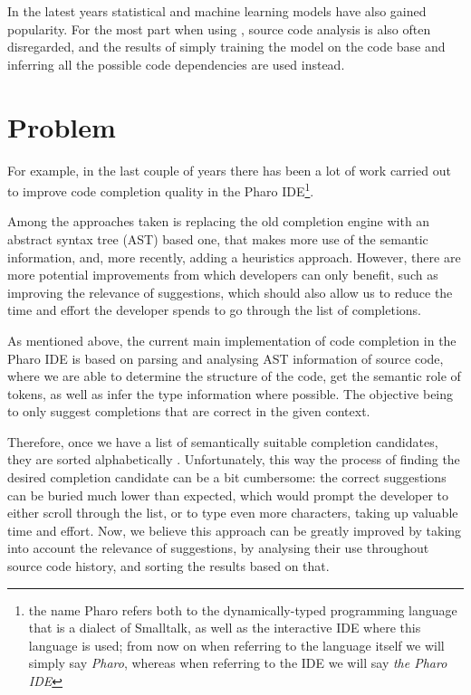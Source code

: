 In the latest years statistical and machine learning  models have also gained popularity.  For the most part when using  , source code analysis  is also often disregarded, and the results of simply training the model on the code base and inferring all the possible code dependencies are used instead. 

\section{Problem}
\label{sec:Introduction-Problem}
For example, in the last couple of years there has been a lot of work carried out to improve code completion quality in the Pharo IDE\footnote{the name Pharo refers both to the dynamically-typed programming language that is a dialect of Smalltalk, as well as the interactive IDE where this language is used; from now on when referring to the language itself we will simply say \textit{Pharo}, whereas when referring to the IDE we will say \textit{the Pharo IDE}}. 

Among the approaches taken is replacing the old completion engine with an abstract syntax tree (AST) based one, that makes more use of the semantic information, and, more recently, adding a heuristics approach.     However, there are more potential improvements from which developers can only benefit, such as improving the relevance of suggestions, which should also allow us to reduce the time and effort the developer spends to go through the list of completions. 

As mentioned above, the current main implementation of code completion in the Pharo IDE is based on parsing and analysing AST information of source code, where we are able to determine the structure of the code, get the semantic role of tokens, as well as infer the type information where possible. The objective being to only suggest completions that are correct in the given context.

Therefore, once we have a list of semantically  suitable completion candidates, they are sorted alphabetically . Unfortunately, this way the process of finding the desired completion candidate can be a bit cumbersome: the correct suggestions can be buried much lower than expected, which would prompt the developer to either scroll through the list, or to type even more characters, taking up valuable time and effort. Now, we believe this approach can be greatly improved by taking into account the relevance of suggestions, by analysing their use throughout source code history, and sorting the results based on that.

